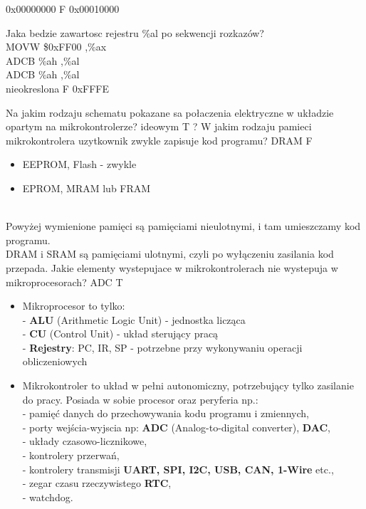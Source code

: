 {0x00000000}
{F}
{0x00010000}
{
	
}
\answer
{Jaka bedzie zawartosc rejestru \%al po sekwencji rozkazów? \\
	MOVW \$0xFF00 ,\%ax\\
	ADCB \%ah ,\%al\\
	ADCB \%ah ,\%al\\
	}
{nieokreslona}
{F}
{0xFFFE}
{
	
}
\answer
{Na jakim rodzaju schematu pokazane sa połaczenia elektryczne w układzie opartym na mikrokontrolerze?}
{ideowym}
{T}
{?}
{}
\answer
{W jakim rodzaju pamieci mikrokontrolera uzytkownik zwykle zapisuje kod programu?}
{DRAM}
{F}
{
	\begin{itemize}
		\item EEPROM, Flash - zwykle
		\item EPROM, MRAM lub FRAM
	\end{itemize}
}
\\{Powyżej wymienione pamięci są pamięciami nieulotnymi, i tam umieszczamy kod programu.\\DRAM i SRAM są pamięciami ulotnymi, czyli po wyłączeniu zasilania kod przepada.}
\answer
{Jakie elementy wystepujace w mikrokontrolerach nie wystepuja w mikroprocesorach?}
{ADC}
{T}
{}
{\begin{itemize}
\item Mikroprocesor to tylko:\\- \textbf{ALU} (Arithmetic Logic Unit) - jednostka licząca\\ - \textbf{CU} (Control Unit) - układ sterujący pracą\\ - \textbf{Rejestry}: PC, IR, SP - potrzebne przy wykonywaniu operacji obliczeniowych\\
\item Mikrokontroler to układ w pełni autonomiczny, potrzebujący tylko zasilanie do pracy. Posiada w sobie procesor oraz peryferia np.:\\- pamięć danych do przechowywania kodu programu i zmiennych,\\- porty wejścia-wyjscia np: \textbf{ADC} (Analog-to-digital converter), \textbf{DAC},\\- układy czasowo-licznikowe, \\- kontrolery przerwań,\\- kontrolery transmisji\textbf{ UART, SPI, I2C, USB, CAN, 1-Wire} etc.,\\- zegar czasu rzeczywistego \textbf{RTC},\\- watchdog.
\end{itemize}}
